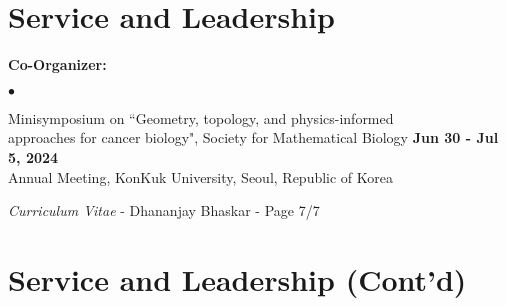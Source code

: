 \documentclass[margin,line]{res}
\newenvironment{list1}{
  \begin{list}{\ding{113}}{
      \setlength{\itemsep}{0in}
      \setlength{\parsep}{0in} \setlength{\parskip}{0in}
      \setlength{\topsep}{0in} \setlength{\partopsep}{0in}
      \setlength{\leftmargin}{0.17in}}}{\end{list}}
\newenvironment{list2}{
  \begin{list}{$\bullet$}{
      \setlength{\itemsep}{0in}
      \setlength{\parsep}{0in} \setlength{\parskip}{0in}
      \setlength{\topsep}{0in} \setlength{\partopsep}{0in}
      \setlength{\leftmargin}{0.2in}}}{\end{list}}
\begin{document}
\begin{resume}
\section{\sc Service and Leadership}

\begin{list1}
\setlength\itemsep{0.5em}
\item[] {\bf Co-Organizer:}
\vspace*{.2cm}
  \begin{list2}
  \setlength\itemsep{0.75em}
  \item[] Minisymposium on ``Geometry, topology, and physics-informed \\
          approaches for cancer biology", Society for Mathematical Biology \hfill {\bf \small Jun 30 - Jul 5, 2024} \\
          Annual Meeting, KonKuk University, Seoul, Republic of Korea
  \end{list2}
\end{list1}

\newpage
\begin{flushright}
\textit{Curriculum Vitae} - Dhananjay Bhaskar - Page 7/7
\end{flushright}

\section{\sc Service and Leadership (Cont'd)}


\end{resume}
\end{document}
